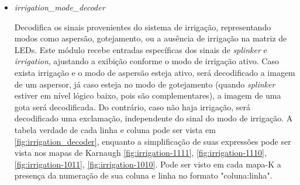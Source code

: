 \documentclass[
	article,			%
	11pt,				%
	oneside,			%
	a4paper,			%
	english,			%
	brazil,				%
	sumario=tradicional
	]{abntex2}
\begin{document}
\begin{itemize}
    \item \textit{irrigation\_mode\_decoder}

    Decodifica os sinais provenientes do sistema de irrigação, representando modos como aspersão, gotejamento, ou a ausência de irrigação na matriz de LEDs. Este módulo recebe entradas específicas dos sinais de \textit{splinker} e  \textit{irrigation}, ajustando a exibição conforme o modo de irrigação ativo.
Caso exista irrigação e o modo de aspersão esteja ativo, será decodificado a imagem de um aspersor, já caso esteja no modo de gotejamento (quando \textit{splinker} estiver em nível lógico baixo, pois são complementares), a imagem de uma gota será decodificada. Do contrário, caso não haja irrigação, será decodificado uma exclamação, independente do sinal do modo de irrigação.
A tabela verdade de cada linha e coluna pode ser vista em \ref{fig:irrigation_decoder}, enquanto a simplificação de suas expressões pode ser vista nos mapas de Karnaugh \ref{fig:irrigation-1111}, \ref{fig:irrigation-1110}, \ref{fig:irrigation-1011}, \ref{fig:irrigation-1010}. Pode ser visto em cada mapa-K a presença da numeração de sua coluna e linha no formato "coluna:linha".

\begin{equation}
\begin{split}
\label{math:valvule}
\end{split}
\end{equation}


\end{itemize}
\end{document}

